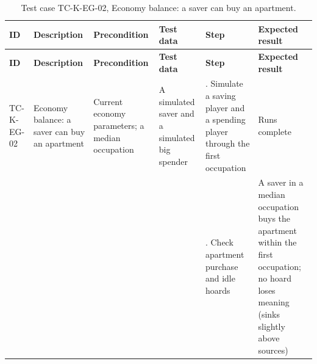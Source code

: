 {\footnotesize{}\renewcommand{\arraystretch}{1.1}
\begin{longtable}{|>{\raggedright\arraybackslash}p{}|>{\raggedright\arraybackslash}p{}|>{\raggedright\arraybackslash}p{}|>{\raggedright\arraybackslash}p{}|>{\raggedright\arraybackslash}p{}|>{\raggedright\arraybackslash}p{}|}
\caption{Test case TC-K-EG-02, Economy balance: a saver can buy an apartment.} \\
\hline
\textbf{ID} & \textbf{Description} & \textbf{Precondition} & \textbf{Test data} & \textbf{Step} & \textbf{Expected result} \\ \hline
\endfirsthead
\hline
\textbf{ID} & \textbf{Description} & \textbf{Precondition} & \textbf{Test data} & \textbf{Step} & \textbf{Expected result} \\ \hline
\endhead
TC-K-EG-02 & Economy balance: a saver can buy an apartment & Current economy parameters; a median occupation & A simulated saver and a simulated big spender & 1. Simulate a saving player and a spending player through the first occupation & Runs complete \\ \cline{5-6}
 &  &  &  & 2. Check apartment purchase and idle hoards & A saver in a median occupation buys the apartment within the first occupation; no hoard loses meaning (sinks slightly above sources) \\ \hline
\end{longtable}
}


